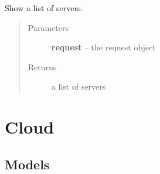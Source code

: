 \documentclass[letterpaper,10pt,english]{sphinxmanual}
\begin{document}

\begin{fulllineitems}
\label{api/cluster:limeade.cluster.views.server_list}
Show a list of servers.
\begin{quote}\begin{description}
\item[{Parameters}] \leavevmode
\textbf{request} -- the request object

\item[{Returns}] \leavevmode
a list of servers

\end{description}\end{quote}

\end{fulllineitems}



\section{Cloud}
\label{api/cloud::doc}\label{api/cloud:cloud}

\subsection{Models}
\label{api/cloud:models}\label{api/cloud:module-limeade.cloud.models}
\end{document}
